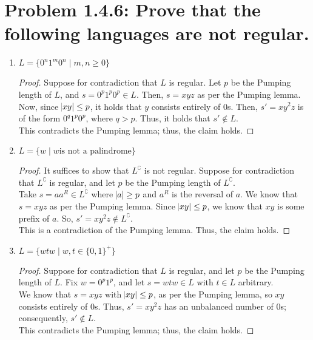 \documentclass[12pt]{article}
\begin{document}
\section*{Problem 1.4.6: Prove that the following languages are not regular.}
\begin{enumerate}[label=(\alph*)]
  \item \textbf{$L = \{0^{n}1^{m}0^{n} \mid m, n \geq 0\}$}
    \begin{proof}
      Suppose for contradiction that $L$ is regular. Let $p$ be the Pumping length of $L$, and $s = 0^{p}1^{p}0^{p} \in L$. Then, $s = xyz$ as per the Pumping lemma. \\
      \newline
      Now, since $\abs{xy} \leq p$, it holds that $y$ consists entirely of 0s. Then, $s' = xy^{2}z$ is of the form $0^{q}1^{p}0^{p}$, where $q > p$. Thus, it holds that $s' \notin L$. \\
      \newline
      This contradicts the Pumping lemma; thus, the claim holds.
    \end{proof}
  \item \textbf{$L = \{w \mid w \text{is not a palindrome}\}$}
    \begin{proof}
      It suffices to show that $L^{\complement}$ is not regular. Suppose for contradiction that $L^{\complement}$ is regular, and let $p$ be the Pumping length of $L^{\complement}$. \\
      \newline
      Take $s = aa^{R} \in L^{\complement}$ where $\abs{a} \geq p$ and $a^{R}$ is the reversal of $a$. We know that $s = xyz$ as per the Pumping lemma. Since $\abs{xy} \leq p$, we know that $xy$ is some prefix of $a$. So, $s' = xy^{2}z \notin L^{\complement}$. \\
      \newline
      This is a contradiction of the Pumping lemma. Thus, the claim holds.
    \end{proof}
  \item \textbf{$L = \{wtw \mid w, t \in \{0, 1\}^{+}\}$}
    \begin{proof}
      Suppose for contradiction that $L$ is regular, and let $p$ be the Pumping length of $L$. Fix $w = 0^{p}1^{p}$, and let $s = wtw \in L$ with $t \in L$ arbitrary. \\
      \newline
      We know that $s = xyz$ with $\abs{xy} \leq p$, as per the Pumping lemma, so $xy$ consists entirely of 0s. Thus, $s' = xy^{2}z$ has an unbalanced number of 0s; consequently, $s' \notin L$. \\
      \newline
      This contradicts the Pumping lemma; thus, the claim holds.
    \end{proof}
\end{enumerate}
\end{document}
